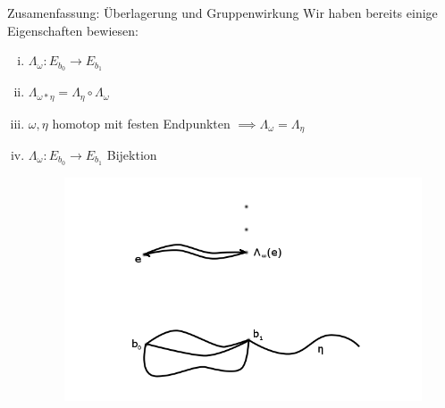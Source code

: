 \documentclass[a4paper,10pt]{scrartcl}
\begin{document}
\begin{seg}{Zusamenfassung: Überlagerung und Gruppenwirkung}
Wir haben bereits einige Eigenschaften bewiesen:
\begin{enumerate}[(i)]
 \item $\Lambda_\omega: E_{b_0} \to E_{b_1}$
 \item $\Lambda_{\omega*\eta}=\Lambda_{\eta} \circ \Lambda_{\omega}$
 \item $\omega, \eta$ homotop mit festen Endpunkten $\implies \Lambda_\omega=\Lambda_\eta$
 \item $\Lambda_\omega: E_{b_0} \to E_{b_1}$ Bijektion\\
\begin{figure}[H]
\centering
 \includegraphics[scale=0.3]{fig80.png}
 \caption{}
\end{figure}
\end{enumerate}
\end{seg}
\end{document}
